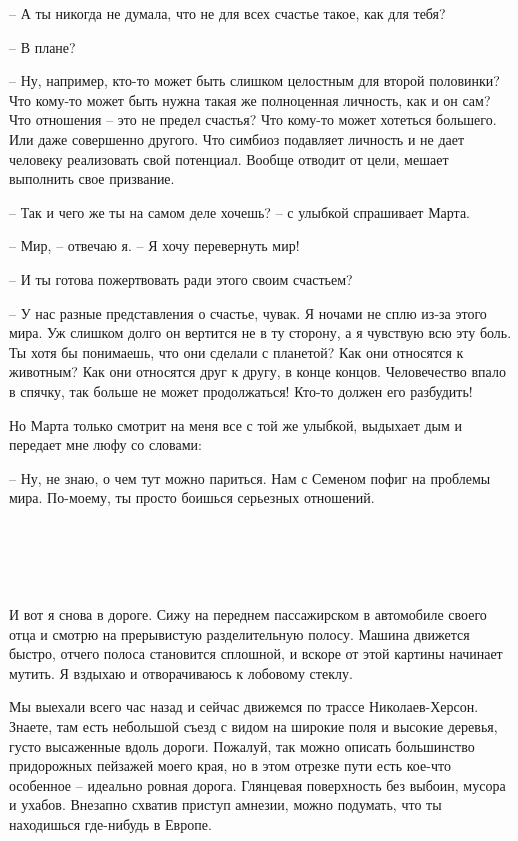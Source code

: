 \documentclass[
]{book}
\begin{document}
-- А ты никогда не думала, что не для всех счастье такое, как для тебя?

-- В плане?

-- Ну, например, кто-то может быть слишком целостным для второй половинки? Что кому-то может быть нужна такая же полноценная личность, как и он сам? Что отношения -- это не предел счастья? Что кому-то может хотеться большего. Или даже совершенно другого. Что симбиоз подавляет личность и не дает человеку реализовать свой потенциал. Вообще отводит от цели, мешает выполнить свое призвание.

-- Так и чего же ты на самом деле хочешь? -- с улыбкой спрашивает Марта.

-- Мир, -- отвечаю я. -- Я хочу перевернуть мир!

-- И ты готова пожертвовать ради этого своим счастьем?

-- У нас разные представления о счастье, чувак. Я ночами не сплю из-за этого мира. Уж слишком долго он вертится не в ту сторону, а я чувствую всю эту боль. Ты хотя бы понимаешь, что они сделали с планетой? Как они относятся к животным? Как они относятся друг к другу, в конце концов. Человечество впало в спячку, так больше не может продолжаться! Кто-то должен его разбудить!

Но Марта только смотрит на меня все с той же улыбкой, выдыхает дым и передает мне люфу со словами:

-- Ну, не знаю, о чем тут можно париться. Нам с Семеном пофиг на проблемы мира. По-моему, ты просто боишься серьезных отношений.

\hypertarget{chapter-47}{%
\chapter{~}\label{chapter-47}}

И вот я снова в дороге. Сижу на переднем пассажирском в автомобиле своего отца и смотрю на прерывистую разделительную полосу. Машина движется быстро, отчего полоса становится сплошной, и вскоре от этой картины начинает мутить. Я вздыхаю и отворачиваюсь к лобовому стеклу.

Мы выехали всего час назад и сейчас движемся по трассе Николаев-Херсон. Знаете, там есть небольшой съезд с видом на широкие поля и высокие деревья, густо высаженные вдоль дороги. Пожалуй, так можно описать большинство придорожных пейзажей моего края, но в этом отрезке пути есть кое-что особенное -- идеально ровная дорога. Глянцевая поверхность без выбоин, мусора и ухабов. Внезапно схватив приступ амнезии, можно подумать, что ты находишься где-нибудь в Европе.
\end{document}
